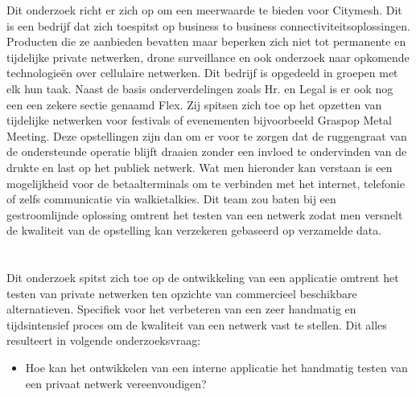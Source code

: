 Dit onderzoek richt er zich op om een meerwaarde te bieden voor Citymesh. Dit is een bedrijf dat zich toespitst op business to business connectiviteitsoplossingen. Producten die ze aanbieden bevatten maar beperken zich niet tot permanente en tijdelijke private netwerken, drone surveillance en ook onderzoek naar opkomende technologieën over cellulaire netwerken. Dit bedrijf is opgedeeld in groepen met elk hun taak. Naast de basis onderverdelingen zoals Hr. en Legal is er ook nog een een zekere sectie genaamd Flex. Zij spitsen zich toe op het opzetten van tijdelijke netwerken voor festivals of evenementen bijvoorbeeld Graspop Metal Meeting. Deze opstellingen zijn dan om er voor te zorgen dat de ruggengraat van de ondersteunde operatie blijft draaien zonder een invloed te ondervinden van de drukte en last op het publiek netwerk. Wat men hieronder kan verstaan is een mogelijkheid voor de betaalterminals om te verbinden met het internet, telefonie of zelfs communicatie via walkietalkies. Dit team zou baten bij een gestroomlijnde oplossing omtrent het testen van een netwerk zodat men versnelt de kwaliteit van de opstelling kan verzekeren gebaseerd op verzamelde data.

\section{}%
\label{sec:onderzoeksvraag}


Dit onderzoek spitst zich toe op de ontwikkeling van een applicatie omtrent het testen van private netwerken ten opzichte van commercieel beschikbare alternatieven. Specifiek voor het verbeteren van een zeer handmatig en tijdsintensief proces om de kwaliteit van een netwerk vast te stellen. Dit alles resulteert in volgende onderzoeksvraag:
\begin{itemize}
    \item Hoe kan het ontwikkelen van een interne applicatie het handmatig testen van een privaat netwerk vereenvoudigen?
\end{itemize}

